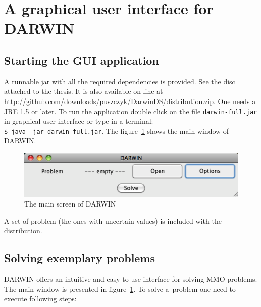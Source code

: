 \label{user-manual}

\section*{A graphical user interface for DARWIN}

\subsection*{Starting the GUI application}

A runnable jar with all the required dependencies is provided. See the disc
attached to the thesis. It is also available on-line at
\url{http://github.com/downloads/puszczyk/DarwinDS/distribution.zip}. One
needs a JRE 1.5 or later. To run the application double click on the file
\texttt{darwin-full.jar} in graphical user interface or type in a terminal:\\
\texttt{\$ java -jar darwin-full.jar}. The figure~\ref{manual_01_main} shows
the main window of DARWIN.

\begin{figure}[htb]
  \centering
  \includegraphics[scale=0.7]{img/manual/01_main_screen}
  \caption{The main screen of DARWIN}
  \label{manual_01_main}
\end{figure}

A set of problem (the ones with uncertain values) is included with the
distribution.

\subsection*{Solving exemplary problems}

DARWIN offers an intuitive and easy to use interface for solving MMO
problems. The main window is presented in figure~\ref{manual_01_main}. To
solve a~problem one need to execute following steps:

